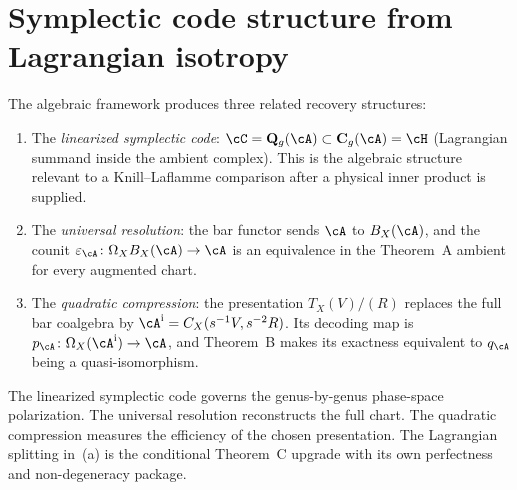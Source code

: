 %
%

\section{Symplectic code structure from Lagrangian isotropy}
\label{sec:hc-knill-laflamme}

\begin{remark}
\label{rem:hc-two-codes}
The algebraic framework produces three related recovery structures:
\begin{enumerate}[label=\textup{(\alph*)}]
\item The \emph{linearized symplectic code}: $\cC = \mathbf{Q}_g(\cA) \subset
 \mathbf{C}_g(\cA) = \cH$
 (Lagrangian summand inside the ambient complex).
 This is the algebraic structure relevant to a Knill--Laflamme
 comparison after a physical inner product is supplied.
\item The \emph{universal resolution}: the bar functor sends $\cA$
 to $B_X(\cA)$, and the counit
 $\varepsilon_\cA\colon\Omega_XB_X(\cA)\to\cA$ is an equivalence in
 the Theorem~A ambient for every augmented chart.
\item The \emph{quadratic compression}: the presentation
 $T_X(V)/(R)$ replaces the full bar coalgebra by
 $\cA^{\mathrm i}=C_X(s^{-1}V,s^{-2}R)$.  Its decoding map is
 $p_\cA\colon\Omega_X(\cA^{\mathrm i})\to\cA$, and Theorem~B makes
 its exactness equivalent to $q_\cA$ being a quasi-isomorphism.
\end{enumerate}
The linearized symplectic code governs the genus-by-genus phase-space
polarization.  The universal resolution reconstructs the full chart.
The quadratic compression measures the efficiency of the chosen
presentation.  The Lagrangian splitting in~(a) is the conditional
Theorem~C upgrade with its own perfectness and non-degeneracy package.
\end{remark}

